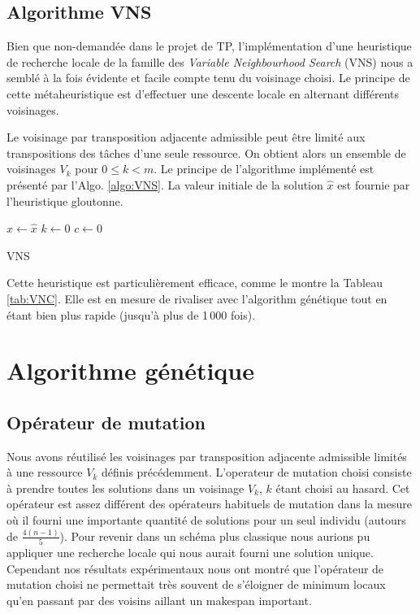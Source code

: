 \documentclass[french]{rapport}
\begin{document}
\subsection{Algorithme VNS}

Bien que non-demandée dans le projet de TP, l'implémentation d'une heuristique de recherche locale
de la famille des \emph{Variable Neighbourhood Search} (VNS) nous a semblé à la fois évidente et
facile compte tenu du voisinage choisi. Le principe de cette métaheuristique est d'effectuer une
descente locale en alternant différents voisinages.

Le voisinage par transposition adjacente admissible peut être limité aux transpositions des tâches
d'une seule ressource. On obtient alors un ensemble de voisinages $V_k$ pour $0 \leq k < m$. Le
principe de l'algorithme implémenté est présenté par l'Algo. \ref{algo:VNS}. La valeur initiale de
la solution $\hat{x}$ est fournie par l'heuristique gloutonne.

\begin{algorithm}[bt]


  $x \leftarrow \hat{x}$ \;
  $k \leftarrow 0$ \;
  $c \leftarrow 0$ \;
  \caption{VNS}
  \label{algo:VNS}
\end{algorithm}

Cette heuristique est particulièrement efficace, comme le montre la Tableau \ref{tab:VNC}. Elle est
en mesure de rivaliser avec l'algorithm génétique tout en étant bien plus rapide (jusqu'à plus de
1\,000 fois).



\section{Algorithme génétique}

\subsection{Opérateur de mutation}

Nous avons réutilisé les voisinages par transposition adjacente admissible limités à une ressource
$V_k$ définis précédemment. L'operateur de mutation choisi consiste à prendre toutes les solutions
dans un voisinage $V_k$, $k$ étant choisi au hasard. Cet opérateur est assez différent des
opérateurs habituels de mutation dans la mesure où il fourni une importante quantité de solutions
pour un seul individu (autours de $\frac{4(n-1)}{5}$). Pour revenir dans un schéma plus classique
nous aurions pu appliquer une recherche locale qui nous aurait fourni une solution unique. Cependant
nos résultats expérimentaux nous ont montré que l'opérateur de mutation choisi ne permettait très
souvent de s'éloigner de minimum locaux qu'en passant par des voisins aillant un makespan important.
\end{document}
